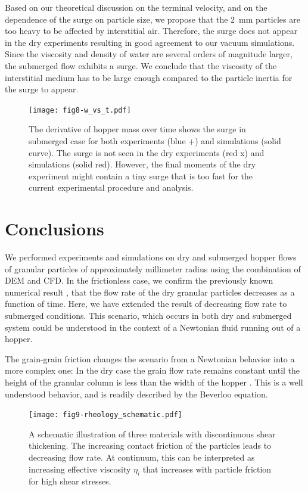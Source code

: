 \documentclass[twoside,twocolumn,9pt]{article}
\begin{document}
Based on our theoretical discussion on the terminal velocity, and on the dependence of the surge on particle size, we propose that the 2~mm particles are too heavy to be affected by interstitial air. Therefore, the surge does not appear in the dry experiments resulting in good agreement to our vacuum simulations. Since the viscosity and density of water are several orders of magnitude larger, the submerged flow exhibits a surge. We conclude that the viscosity of the interstitial medium has to be large enough compared to the particle inertia for the surge to appear.
%
\begin{figure}[!t]
 \texttt{[image: fig8-w\_vs\_t.pdf]}\\
 \caption{The derivative of hopper mass over time shows the surge in submerged case for both experiments (blue +) and simulations (solid curve). The surge is not seen in the dry experiments (red x) and simulations (solid red). However, the final moments of the dry experiment might contain a tiny surge that is too fast for the current experimental procedure and analysis.}
 \label{fig:derivated_data}
\end{figure}


\section{Conclusions}

We performed experiments and simulations on dry and submerged hopper 
flows of granular particles of approximately millimeter radius using the 
combination of DEM and CFD. 
In the frictionless case, we confirm the previously known numerical result 
\cite{Langston1994}, that the flow rate of the dry granular particles 
decreases as a function of time. 
Here, we have extended the result of decreasing flow rate to submerged 
conditions.
This scenario, which occurs in both dry and submerged system could be 
understood in the context of a Newtonian fluid running out of a hopper.

The grain-grain friction changes the scenario from a Newtonian behavior into a more complex one: In the dry case the grain flow rate remains constant until the height of the granular column is less than the width of the hopper \cite{Nedderman1982}. This is a well understood behavior, and is readily described by the Beverloo equation.

\begin{figure}[!t] 
 \texttt{[image: fig9-rheology\_schematic.pdf]}\\
 \caption{A schematic illustration of three materials with discontinuous shear thickening. The increasing contact friction of the particles leads to decreasing flow rate. At continuum, this can be interpreted as increasing effective viscosity $\eta_{i}$ that increases with particle friction for high shear stresses.}\label{fig:DST}
\end{figure}
\end{document}
